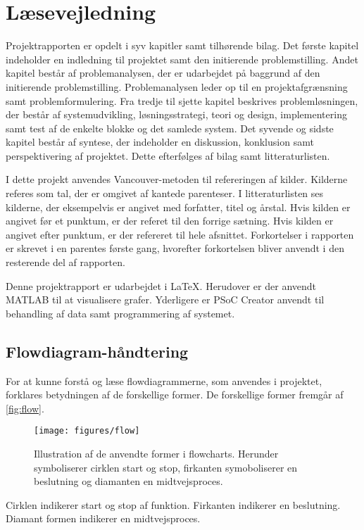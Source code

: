 \section*{Læsevejledning}
Projektrapporten er opdelt i syv kapitler samt tilhørende bilag. Det første kapitel indeholder en indledning til projektet samt den initierende problemstilling. Andet kapitel består af problemanalysen, der er udarbejdet på baggrund af den initierende problemstilling. Problemanalysen leder op til en projektafgrænsning samt problemformulering. Fra tredje til sjette kapitel beskrives problemløsningen, der består af systemudvikling, løsningsstrategi, teori og design, implementering samt test af de enkelte blokke og det samlede system. Det syvende og sidste kapitel består af syntese, der indeholder en diskussion, konklusion samt perspektivering af projektet. Dette efterfølges af bilag samt litteraturlisten. 

I dette projekt anvendes Vancouver-metoden til refereringen af kilder. Kilderne referes som tal, der er omgivet af kantede parenteser. I litteraturlisten ses kilderne, der eksempelvis er angivet med forfatter, titel og årstal. Hvis kilden er angivet før et punktum, er der referet til den forrige sætning. Hvis kilden er angivet efter punktum, er der refereret til hele afsnittet. Forkortelser i rapporten er skrevet i en parentes første gang, hvorefter forkortelsen bliver anvendt i den resterende del af rapporten.
 
Denne projektrapport er udarbejdet i \LaTeX. Herudover er der anvendt MATLAB  til at visualisere grafer. Yderligere er PSoC Creator anvendt til behandling af data samt programmering af systemet.  


\subsection*{Flowdiagram-håndtering} \label{sec:flowhaandtering}
For at kunne forstå og læse flowdiagrammerne, som anvendes i projektet, forklares betydningen af de forskellige former. De forskellige former fremgår af \autoref{fig:flow}.

\begin{figure}[H]
\centering
\texttt{[image: figures/flow]}
\caption{Illustration af de anvendte former i flowcharts. Herunder symboliserer cirklen start og stop, firkanten symoboliserer en beslutning og diamanten en midtvejsproces.}
\label{fig:flow}
\end{figure}

\noindent
Cirklen indikerer start og stop af funktion. Firkanten indikerer en beslutning. Diamant formen indikerer en midtvejsproces.